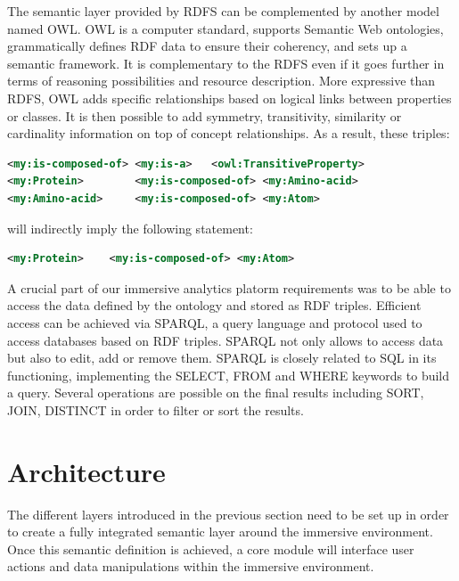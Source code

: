 \documentclass{vgtc}                          %
\begin{document}
The semantic layer provided by RDFS can be complemented by another model named OWL. OWL is a computer standard, supports Semantic Web ontologies, grammatically defines RDF data to ensure their coherency, and sets up a semantic framework. It is complementary to the RDFS even if it goes further in terms of reasoning possibilities and resource description. More expressive than RDFS, OWL adds specific relationships based on logical links between properties or classes. It is then possible to add symmetry, transitivity, similarity or cardinality information on top of concept relationships.
As a result, these triples:
\begin{lstlisting}[language=XML]
<my:is-composed-of>	<my:is-a>	<owl:TransitiveProperty>
<my:Protein>		<my:is-composed-of>	<my:Amino-acid>
<my:Amino-acid>		<my:is-composed-of>	<my:Atom>
\end{lstlisting}
will indirectly imply the following statement:
\begin{lstlisting}[language=XML]
<my:Protein>	<my:is-composed-of>	<my:Atom>
\end{lstlisting}

A crucial part of our immersive analytics platorm requirements was to be able to access the data defined by the ontology and stored as RDF triples. Efficient access can be achieved via SPARQL, a query language and protocol used to access databases based on RDF triples. SPARQL not only allows to access data but also to edit, add or remove them. 
SPARQL is closely related to SQL in its functioning, implementing the SELECT, FROM and WHERE keywords to build a query. 
Several operations are possible on the final results including SORT, JOIN, DISTINCT in order to filter or sort the results.

\section{Architecture}

The different layers introduced in the previous section need to be set up in order to create a fully integrated semantic layer around the immersive environment. Once this semantic definition is achieved, a core module will interface user actions and data manipulations within the immersive environment.
\end{document}
